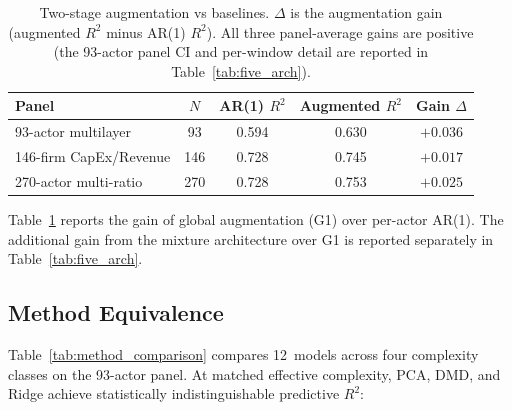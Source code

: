 \documentclass[11pt,a4paper]{article}
\begin{document}
\begin{table}[ht]
\centering
\caption{Two-stage augmentation vs baselines. $\Delta$ is the augmentation gain (augmented $R^2$ minus AR(1) $R^2$). All three panel-average gains are positive (the 93-actor panel CI and per-window detail are reported in Table~\ref{tab:five_arch}).}
\label{tab:augmentation}
\small
\begin{tabular}{lcccc}
\toprule
Panel & $N$ & AR(1) $R^2$ & Augmented $R^2$ & Gain $\Delta$ \\
\midrule
93-actor multilayer & 93 & 0.594 & 0.630 & $+0.036$ \\
146-firm CapEx/Revenue & 146 & 0.728 & 0.745 & $+0.017$ \\
270-actor multi-ratio & 270 & 0.728 & 0.753 & $+0.025$ \\
\bottomrule
\end{tabular}
\end{table}

Table~\ref{tab:augmentation} reports the gain of global augmentation (G1) over per-actor AR(1). The additional gain from the mixture architecture over G1 is reported separately in Table~\ref{tab:five_arch}.

\subsection{Method Equivalence}
\label{sec:method_equiv}

Table~\ref{tab:method_comparison} compares 12~models across four complexity classes on the 93-actor panel. At matched effective complexity, PCA, DMD, and Ridge achieve statistically indistinguishable predictive $R^2$:
\end{document}
